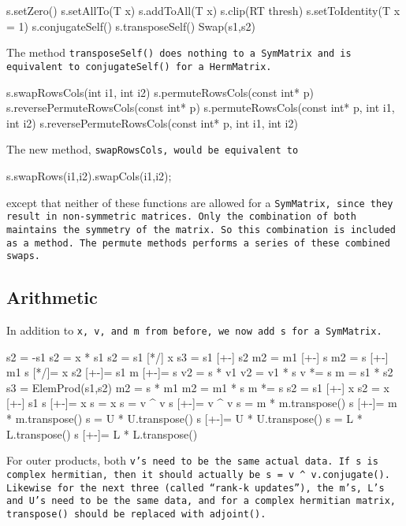 \begin{tmvcode}
s.setZero()
s.setAllTo(T x)
s.addToAll(T x)
s.clip(RT thresh)
s.setToIdentity(T x = 1)
s.conjugateSelf()
s.transposeSelf()
Swap(s1,s2)
\end{tmvcode}
The method \tt{transposeSelf()} does nothing to a \tt{SymMatrix} and is equivalent to
\tt{conjugateSelf()} for a \tt{HermMatrix}.
\begin{tmvcode}
s.swapRowsCols(int i1, int i2)
s.permuteRowsCols(const int* p)
s.reversePermuteRowsCols(const int* p)
s.permuteRowsCols(const int* p, int i1, int i2)
s.reversePermuteRowsCols(const int* p, int i1, int i2)
\end{tmvcode}
The new method, \tt{swapRowsCols}, would be equivalent to 
\begin{tmvcode}
s.swapRows(i1,i2).swapCols(i1,i2);
\end{tmvcode}
except that neither of these functions are allowed for a \tt{SymMatrix}, since 
they result in non-symmetric matrices.  Only the combination of both
maintains the symmetry of the matrix.  So this combination is included as
a method.  The permute methods performs a series of these
combined swaps.
\vspace{12pt}

\subsection{Arithmetic}
\label{SymMatrix_Arithmetic}

In addition to \tt{x}, \tt{v}, and \tt{m} from before,
we now add \tt{s} for a \tt{SymMatrix}.

\begin{tmvcode}
s2 = -s1
s2 = x * s1
s2 = s1 [*/] x
s3 = s1 [+-] s2
m2 = m1 [+-] s
m2 = s [+-] m1
s [*/]= x
s2 [+-]= s1
m [+-]= s
v2 = s * v1
v2 = v1 * s
v *= s
m = s1 * s2
s3 = ElemProd(s1,s2)
m2 = s * m1
m2 = m1 * s
m *= s
s2 = s1 [+-] x
s2 = x [+-] s1
s [+-]= x
s = x
s = v ^ v
s [+-]= v ^ v
s = m * m.transpose()
s [+-]= m * m.transpose()
s = U * U.transpose()
s [+-]= U * U.transpose()
s = L * L.transpose()
s [+-]= L * L.transpose()
\end{tmvcode}
For outer products, both \tt{v}'s need to be the same actual data.  If \tt{s}
is complex hermitian, then it should actually be 
\tt{s = v ^ v.conjugate()}.
Likewise for the next three (called ``rank-k updates''), the \tt{m}'s, \tt{L}'s and
\tt{U}'s need to be the
same data, and for a complex hermitian matrix, \tt{transpose()}
should be replaced with \tt{adjoint()}.


